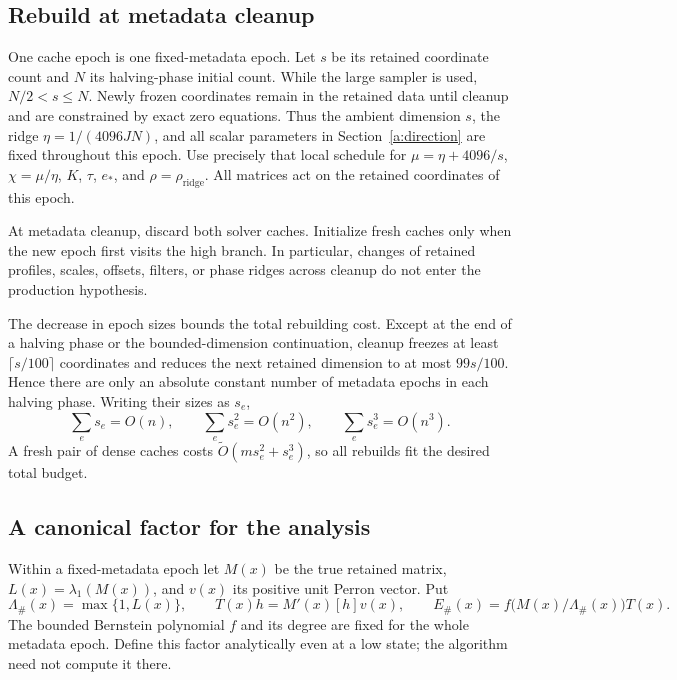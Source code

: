 \documentclass[11pt]{amsart}
\theoremstyle{definition}\newtheorem{definition}[theorem]{Definition}
\theoremstyle{remark}\newtheorem{remark}[theorem]{Remark}
\numberwithin{equation}{section}
\begin{document}
\subsection{Rebuild at metadata cleanup}\label{d:epochs}
One cache epoch is one fixed-metadata epoch. Let $s$ be its retained
coordinate count and $N$ its halving-phase initial count. While the large
sampler is used, $N/2<s\le N$. Newly frozen coordinates remain in the
retained data until cleanup and are constrained by exact zero equations.
Thus the ambient dimension $s$, the ridge
$\eta=1/(4096JN)$, and all scalar parameters in
Section~\ref{a:direction} are fixed throughout this epoch. Use precisely
that local schedule for $\mu=\eta+4096/s$, $\chi=\mu/\eta$, $K$, $\tau$,
$e_*$, and $\rho=\rho_{\mathrm{ridge}}$.
All matrices act on the retained coordinates of this epoch.

At metadata cleanup, discard both solver caches. Initialize fresh caches
only when the new epoch first visits the high branch. In particular,
changes of retained profiles, scales, offsets, filters, or phase ridges
across cleanup do not enter the production hypothesis.

The decrease in epoch sizes bounds the total rebuilding cost. Except at the end of a halving
phase or the bounded-dimension continuation, cleanup freezes at least
$\lceil s/100\rceil$ coordinates and reduces the next retained dimension
to at most $99s/100$. Hence there are only an absolute constant number of
metadata epochs in each halving phase. Writing their sizes as $s_e$,
\begin{equation}\label{d:epoch-sums}
 \sum_e s_e=O(n),\qquad \sum_e s_e^2=O(n^2),\qquad
 \sum_e s_e^3=O(n^3).
\end{equation}
A fresh pair of dense caches costs
$\widetilde O(ms_e^2+s_e^3)$, so all rebuilds fit the desired total budget.

\subsection{A canonical factor for the analysis}\label{d:ideal-factor}
Within a fixed-metadata epoch let $M(x)$ be the true retained matrix,
$L(x)=\lambda_1(M(x))$, and $v(x)$ its positive unit Perron vector. Put
\begin{equation}\label{d:canonical}
 \Lambda_\#(x)=\max\{1,L(x)\},\qquad
 T(x)h=M'(x)[h]v(x),\qquad
 E_\#(x)=f\bigl(M(x)/\Lambda_\#(x)\bigr)T(x).
\end{equation}
The bounded Bernstein polynomial $f$ and its degree are fixed for the
whole metadata epoch. Define this factor analytically even at a low
state; the algorithm need not compute it there.
\end{document}
